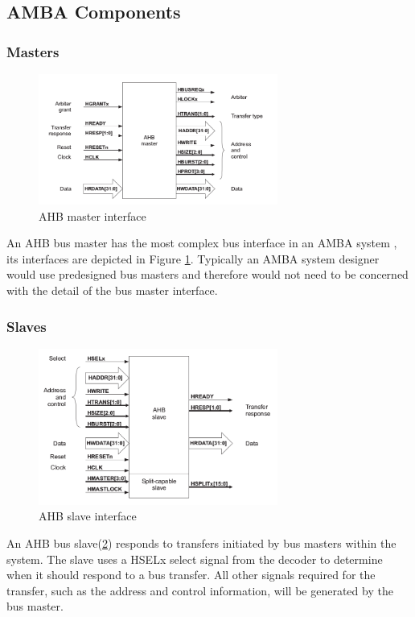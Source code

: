 \subsection{AMBA Components}
\subsubsection{Masters}
\begin{figure}[ht]
    \centering
    \includegraphics[width=0.7\textwidth]{figures/others/master_ahb.png}
    \caption{AHB master interface}
    \label{fig:masterint}
\end{figure}

 An AHB bus master has the most complex bus interface in an AMBA system , its interfaces are depicted in Figure \ref{fig:masterint}. Typically an AMBA system designer would use predesigned bus masters and therefore would not need to be concerned with the detail of the bus master interface.



\subsubsection{Slaves}

\begin{figure}[ht]
    \centering
    \includegraphics[width=0.7\textwidth]{figures/others/slave_ahb.png}
    \caption{AHB slave interface}
    \label{fig:slaveint}
\end{figure}
An AHB bus slave(\ref{fig:slaveint}) responds to transfers initiated by bus masters within the system. The slave uses a HSELx select signal from the decoder to determine when it should respond to a bus transfer. All other signals required for the transfer, such as the address and control information, will be generated by the bus master.
 
